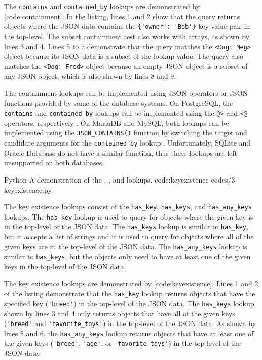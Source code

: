 The \verb|contains| and \verb|contained_by| lookups are demonstrated by
\autoref{code:containment}. In the listing, lines 1 and 2 show that the query
returns objects where the JSON data contains the \verb|{'owner': 'Bob'}|
key-value pair in the top-level. The subset containment test also works with
arrays, as shown by lines 3 and 4. Lines 5 to 7 demonstrate that the query
matches the \verb|<Dog: Meg>| object because its JSON data is a subset of the
lookup value. The query also matches the \verb|<Dog: Fred>| object because an
empty JSON object is a subset of any JSON object, which is also shown by lines
8 and 9.

The containment lookups can be implemented using JSON operators or JSON
functions provided by some of the database systems. On PostgreSQL, the
\verb|contains| and \verb|contained_by| lookups can be implemented using the
\verb|@>| and \verb|<@| operators, respectively \cite{postgres:json_operators}.
On MariaDB and MySQL, both lookups can be implemented using the
\verb|JSON_CONTAINS()| function by switching the target and candidate arguments
for the \verb|contained_by| lookup \cite{mariadb:json_contains,
mysql:json_search}. Unfortunately, SQLite and Oracle Database do not have a
similar function, thus these lookups are left unsupported on both databases.

\listing
{Python}
{A demonstration of the
, , and  lookups.}
{code:keyexistence}
{codes/3-keyexistence.py}

The key existence lookups consist of the \verb|has_key|, \verb|has_keys|, and
\verb|has_any_keys| lookups. The \verb|has_key| lookup is used to query for
objects where the given key is in the top-level of the JSON data. The
\verb|has_keys| lookup is similar to \verb|has_key|, but it accepts a list of
strings and it is used to query for objects where all of the given keys are
in the top-level of the JSON data. The \verb|has_any_keys| lookup is similar
to \verb|has_keys|, but the objects only need to have at least one of the
given keys in the top-level of the JSON data.

The key existence lookups are demonstrated by \autoref{code:keyexistence}.
Lines 1 and 2 of the listing demonstrate that the \verb|has_key| lookup
returns objects that have the specified key (\verb|'breed'|) in the top-level
of the JSON data. The \verb|has_keys| lookup shown by lines 3 and 4 only
returns objects that have all of the given keys (\verb|'breed'| and
\verb|'favorite_toys'|) in the top-level of the JSON data. As shown by lines 5
and 6, the \verb|has_any_keys| lookup returns objects that have at least one
of the given keys (\verb|'breed'|, \verb|'age'|, or \verb|'favorite_toys'|) in
the top-level of the JSON data.

